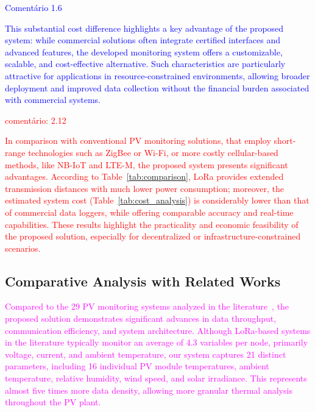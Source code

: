 \documentclass{ieeeaccess}
\begin{document}
\textcolor{blue}{Comentário 1.6}

\textcolor{blue}{
This substantial cost difference highlights a key advantage of the proposed system: while commercial solutions often integrate certified interfaces and advanced features, the developed monitoring system offers a customizable, scalable, and cost-effective alternative. Such characteristics are particularly attractive for applications in resource-constrained environments, allowing broader deployment and improved data collection without the financial burden associated with commercial systems.
}

\textcolor{red}{comentário: 2.12}

\textcolor{red}{
In comparison with conventional PV monitoring solutions, that employ short-range technologies such as ZigBee or Wi-Fi, or more costly cellular-based methods, like NB-IoT and LTE-M, the proposed system presents significant advantages. According to Table~\ref{tab:comparison}, LoRa provides extended transmission distances with much lower power consumption; moreover, the estimated system cost (Table~\ref{tab:cost_analysis}) is considerably lower than that of commercial data loggers, while offering comparable accuracy and real-time capabilities. These results highlight the practicality and economic feasibility of the proposed solution, especially for decentralized or infrastructure-constrained scenarios.
}





\subsection{Comparative Analysis with Related Works}

\textcolor{magenta}{
Compared to the 29 PV monitoring systems analyzed in the literature~\cite{1,2,3,4,5,7,8,9,11,12,13,15,16,17,montero2016,almeida2018,20,22,23,24,25,26,27,28,29,Dupont2020,rodrigues2020,Cheddadi2020,Rodrigues2020}, the proposed solution demonstrates significant advances in data throughput, communication efficiency, and system architecture. Although LoRa-based systems in the literature typically monitor an average of 4.3 variables per node, primarily voltage, current, and ambient temperature, our system captures 21 distinct parameters, including 16 individual PV module temperatures, ambient temperature, relative humidity, wind speed, and solar irradiance. This represents almost five times more data density, allowing more granular thermal analysis throughout the PV plant.}
\end{document}
